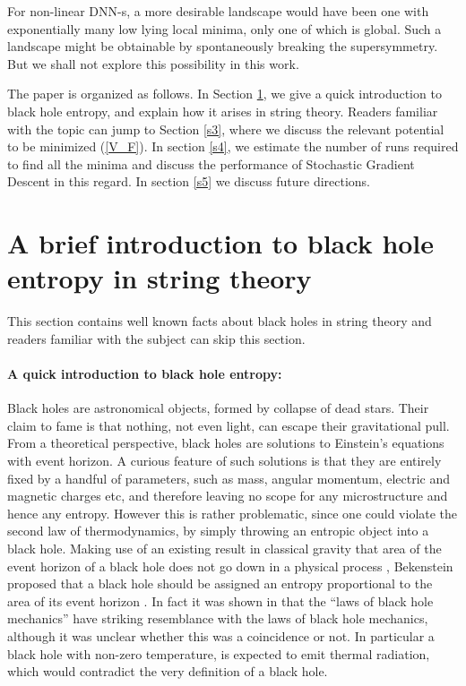 \documentclass[12pt,a4paper]{JHEP3}
\newcommand{\refb}[1]{(\ref{#1})}
\begin{document}
For non-linear DNN-s, a more desirable landscape would have been one with exponentially many low lying local minima, only one of which is global. Such a landscape might be obtainable by spontaneously breaking the supersymmetry. But we shall not explore this possibility in this work.

The paper is organized as follows. In Section \ref{s2}, we give a quick introduction to black hole entropy, and explain how it arises in string theory. Readers familiar with the topic can jump to Section \ref{s3}, where we discuss the relevant potential to be minimized \refb{V_F}. In section \ref{s4}, we estimate the number of runs required to find all the minima and discuss the performance of Stochastic Gradient Descent in this regard. In section \ref{s5} we discuss future directions.




\section{A brief introduction to black hole entropy in string theory} \label{s2}
This section contains well known facts about black holes in string theory and readers familiar with the subject can skip this section.

\paragraph{A quick introduction to black hole entropy:}
Black holes are astronomical objects, formed by collapse of  dead stars. Their claim to fame is that nothing, not even light, can escape their gravitational  pull.
From a theoretical perspective, black holes are solutions to Einstein's equations with event horizon. A curious feature of such solutions is that they are entirely fixed by a handful  of parameters, such as mass, angular  momentum, electric and magnetic charges etc, and therefore leaving no scope for any microstructure and hence any entropy. However this is rather problematic, since one could violate the second law of thermodynamics, by simply throwing an entropic object into a black hole. Making use of an existing result in classical gravity that area of the event horizon  of a black hole does not go down in a physical process \cite{PhysRevLett.26.1344}, Bekenstein proposed that a black hole should be assigned an entropy proportional to the area of its event horizon \cite{Bekenstein1, Bekenstein2}. In fact it was shown in \cite{BCH} that the ``laws of black hole mechanics'' have striking resemblance with the laws of black  hole mechanics, although it was unclear whether this was a coincidence or not. In particular a black hole with non-zero temperature, is expected to emit thermal radiation, which would contradict the very  definition of a black hole.
\end{document}
